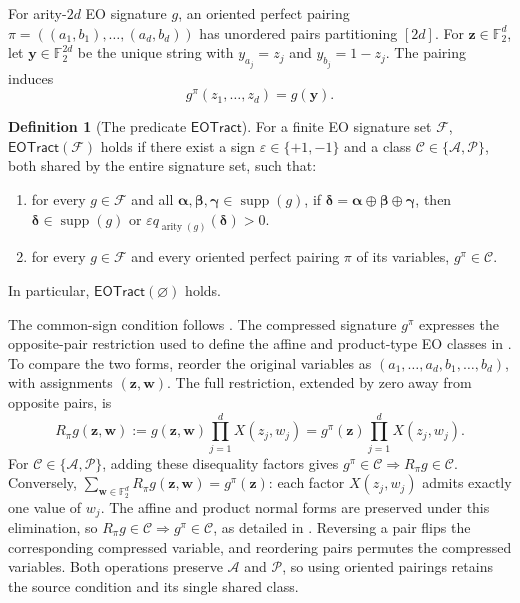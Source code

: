 \documentclass[11pt,letterpaper,onecolumn]{article}
\theoremstyle{plain}
\theoremstyle{definition}
\newtheorem{definition}[definition]{Definition}
\theoremstyle{remark}
\newcommand{\Ftwo}{\mathbb F_2}
\newcommand{\cF}{\mathcal F}
\newcommand{\cA}{\mathscr A}
\newcommand{\cP}{\mathscr P}
\newcommand{\cC}{\mathscr C}
\newcommand{\EOTract}{\mathsf{EOTract}}
\newcommand{\supp}{\operatorname{supp}}
\newcommand{\arity}{\operatorname{arity}}
\begin{document}
	For arity-\(2d\) EO signature \(g\), an oriented perfect pairing
	\(\pi=((a_1,b_1),\ldots,(a_d,b_d))\) has unordered pairs partitioning
	\([2d]\).  For \({\mathbf z}\in\Ftwo^d\), let \({\mathbf y}\in\Ftwo^{2d}\) be the unique string
	with \(y_{a_j}=z_j\) and \(y_{b_j}=1-z_j\). The pairing induces
	\begin{equation*}
		g^\pi(z_1,\ldots,z_d)=g({\mathbf y}).
	\end{equation*}
	
	\begin{definition}[The predicate \(\EOTract\)]
		\label{def:eo-tract}
		For a finite EO signature set \(\cF\), \(\EOTract(\cF)\) holds if there exist a
		sign \(\varepsilon\in\{+1,-1\}\) and a class
		\(\cC\in\{\cA,\cP\}\), both shared by the entire signature set, such that:
		\begin{enumerate}
			\item for every \(g\in\cF\) and all
			\({\boldsymbol{\alpha}},{\boldsymbol{\beta}},{\boldsymbol{\gamma}}\in\supp(g)\), if
			\({\boldsymbol{\delta}}={\boldsymbol{\alpha}}\oplus{\boldsymbol{\beta}}\oplus{\boldsymbol{\gamma}}\), then
			\({\boldsymbol{\delta}}\in\supp(g)\) or
			\(\varepsilon q_{\arity(g)}({\boldsymbol{\delta}})>0\).
			\item for every \(g\in\cF\) and every oriented perfect pairing \(\pi\)
			of its variables, \(g^\pi\in\cC\).
		\end{enumerate}
        In particular, \(\EOTract(\varnothing)\) holds.
	\end{definition}
	
The common-sign condition follows \cite[Theorem~26]{MengWangXia2025EO}.
The compressed signature \(g^\pi\) expresses the opposite-pair restriction
used to define the affine and product-type EO classes in
\cite[Definition~22]{MengWangXia2024TypicalEO}.  To compare the two
forms, reorder the original variables as
\((a_1,\ldots,a_d,b_1,\ldots,b_d)\), with assignments \(({\mathbf z},{\mathbf w})\).
The full restriction, extended by zero away from opposite pairs, is
\[
R_\pi g({\mathbf z},{\mathbf w}):=g({\mathbf z},{\mathbf w})\prod_{j=1}^dX(z_j,w_j)
=g^\pi({\mathbf z})\prod_{j=1}^dX(z_j,w_j).
\]
For \(\cC\in\{\cA,\cP\}\), adding these disequality factors gives
\(g^\pi\in\cC\Rightarrow R_\pi g\in\cC\).  Conversely,
\(\sum_{{\mathbf w}\in\Ftwo^d}R_\pi g({\mathbf z},{\mathbf w})=g^\pi({\mathbf z})\): each factor
\(X(z_j,w_j)\) admits exactly one value of \(w_j\).
The affine and product normal forms are preserved under this elimination,
so \(R_\pi g\in\cC\Rightarrow g^\pi\in\cC\), as detailed in
\cite[Section~2.10.2]{Liu2026DEQ2Holant}.
Reversing a pair flips the corresponding compressed variable, and
reordering pairs permutes the compressed variables.  Both operations
preserve \(\cA\) and \(\cP\), so using oriented pairings retains the
source condition and its single shared class.
\end{document}
